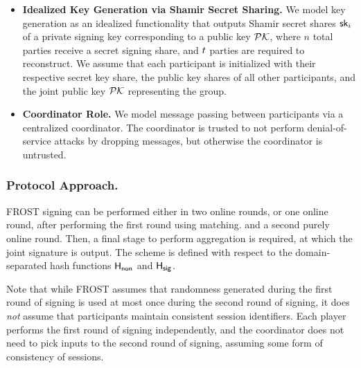 \begin{itemize}[itemsep=0.5em]
\item \textbf{Idealized Key Generation via Shamir Secret Sharing.}
We model key generation as an idealized functionality that outputs Shamir secret shares $\mathsf{sk}_i$ of a private signing key corresponding to a public key $\mathcal{PK}$, 
where $n$ total parties receive a secret signing  share, 
and $t$ parties are required to reconstruct. 
We assume that each participant is initialized  with their respective secret key share,
the public key shares of all other participants,
and the joint public key $\mathcal{PK}$ representing the group.
\item \textbf{Coordinator Role.} We model message passing between participants
via a centralized coordinator.
The coordinator is trusted to not perform denial-of-service attacks by dropping messages,
but otherwise the coordinator is untrusted.
\end{itemize}

\subsubsection{Protocol Approach.}

FROST signing can be performed either in two online rounds,
or one online round,
after performing the first round using matching.
and a second purely online round.  
Then, a final stage to perform aggregation is required,
at which the joint signature is output.
The scheme is defined with respect to the domain-separated hash functions $\mathsf{H_{non}}$ and $\mathsf{H_{sig}}$.

Note that while FROST assumes that randomness generated during the first round of signing is used at most once during the second round of signing,
it does \emph{not} assume that participants maintain consistent session identifiers.
Each player  performs the first round of signing independently,
and the coordinator does not need to pick inputs to the second round of signing,
assuming some form of consistency of sessions. 

